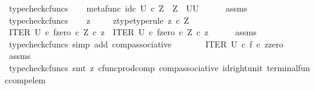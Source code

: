\begin{isabellebody}
\ typecheck{\isacharunderscore}{\kern0pt}cfuncs\isanewline
\ \ \isamarkupfalse%
\ {\isachardoublequoteopen}metafunc\ {\isacharparenleft}{\kern0pt}id\isactrlsub c\ U{\isacharparenright}{\kern0pt}\ {\isasymcirc}\isactrlsub c\ {\isasymbeta}\isactrlbsub Z\isactrlesub \ {\isacharcolon}{\kern0pt}\ Z\ {\isasymrightarrow}\ U\isactrlbsup U\isactrlesup {\isachardoublequoteclose}\isanewline
\ \ \ \ \isamarkupfalse%
\ assms\ \isamarkupfalse%
\ typecheck{\isacharunderscore}{\kern0pt}cfuncs\isanewline
{}\isamarkupfalse%
\isanewline
\ \ \isamarkupfalse%
\ z\ \isanewline
\ \ \isamarkupfalse%
\ z{\isacharunderscore}{\kern0pt}type{\isacharbrackleft}{\kern0pt}type{\isacharunderscore}{\kern0pt}rule{\isacharbrackright}{\kern0pt}{\isacharcolon}{\kern0pt}\ {\isachardoublequoteopen}z\ {\isasymin}\isactrlsub c\ Z{\isachardoublequoteclose}\isanewline
\ \ \isamarkupfalse%
\ {\isachardoublequoteopen}{\isacharparenleft}{\kern0pt}ITER\ U\ {\isasymcirc}\isactrlsub c\ {\isasymlangle}f{\isacharcomma}{\kern0pt}zero\ {\isasymcirc}\isactrlsub c\ {\isasymbeta}\isactrlbsub Z\isactrlesub {\isasymrangle}{\isacharparenright}{\kern0pt}\ {\isasymcirc}\isactrlsub c\ z\ {\isacharequal}{\kern0pt}\ ITER\ U\ {\isasymcirc}\isactrlsub c\ {\isasymlangle}f{\isacharcomma}{\kern0pt}zero\ {\isasymcirc}\isactrlsub c\ {\isasymbeta}\isactrlbsub Z\isactrlesub {\isasymrangle}\ {\isasymcirc}\isactrlsub c\ z{\isachardoublequoteclose}\isanewline
\ \ \ \ \isamarkupfalse%
\ assms\ \isamarkupfalse%
\ {\isacharparenleft}{\kern0pt}typecheck{\isacharunderscore}{\kern0pt}cfuncs{\isacharcomma}{\kern0pt}\ simp\ add{\isacharcolon}{\kern0pt}\ comp{\isacharunderscore}{\kern0pt}associative{}{\isacharparenright}{\kern0pt}\isanewline
\ \ \isamarkupfalse%
\ \isamarkupfalse%
\ {\isachardoublequoteopen}{\isachardot}{\kern0pt}{\isachardot}{\kern0pt}{\isachardot}{\kern0pt}\ {\isacharequal}{\kern0pt}\ ITER\ U\ {\isasymcirc}\isactrlsub c\ {\isasymlangle}f\ {\isasymcirc}\isactrlsub c\ z{\isacharcomma}{\kern0pt}zero{\isasymrangle}{\isachardoublequoteclose}\isanewline
\ \ \ \ \isamarkupfalse%
\ assms\ \isamarkupfalse%
\ {\isacharparenleft}{\kern0pt}typecheck{\isacharunderscore}{\kern0pt}cfuncs{\isacharcomma}{\kern0pt}\ smt\ {\isacharparenleft}{\kern0pt}z{}{\isacharparenright}{\kern0pt}\ cfunc{\isacharunderscore}{\kern0pt}prod{\isacharunderscore}{\kern0pt}comp\ comp{\isacharunderscore}{\kern0pt}associative{}\ id{\isacharunderscore}{\kern0pt}right{\isacharunderscore}{\kern0pt}unit{}\ terminal{\isacharunderscore}{\kern0pt}func{\isacharunderscore}{\kern0pt}comp{\isacharunderscore}{\kern0pt}elem{\isacharparenright}{\kern0pt}\isanewline

\end{isabellebody}
